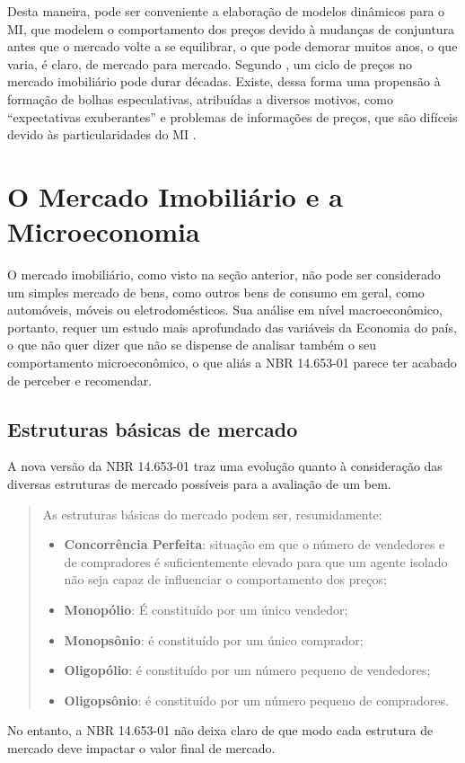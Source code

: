 \documentclass[
	12pt,				%
	oneside,			%
	a4paper,			%
	chapter=TITLE,		%
	section=TITLE,		%
	english,			%
	brazil				%
	]{abntex2}
\begin{document}
Desta maneira, pode ser conveniente a elaboração de modelos dinâmicos para o
\gls{MI}, que modelem o comportamento dos preços devido à mudanças de conjuntura
antes que o mercado volte a se equilibrar, o que pode demorar muitos anos, o que
varia, é claro, de mercado para mercado. Segundo \textcite[p.~4]{regulation}, um ciclo de
preços no mercado imobiliário pode durar décadas. Existe, dessa forma uma
propensão à formação de bolhas especulativas, atribuídas a diversos motivos,
como ``expectativas exuberantes'' e problemas de informações de preços, que são
difíceis devido às particularidades do \gls{MI} \autocite[3]{ADAMS2010}.

\hypertarget{micro}{%
\section{O Mercado Imobiliário e a Microeconomia}\label{micro}}

O mercado imobiliário, como visto na seção anterior, não pode ser
considerado um simples mercado de bens, como outros bens de consumo em geral,
como automóveis, móveis ou eletrodomésticos. Sua análise em nível macroeconômico,
portanto, requer um estudo mais aprofundado das variáveis da Economia do país,
o que não quer dizer que não se dispense de analisar também o seu comportamento
microeconômico, o que aliás a NBR 14.653-01 \autocite*{NBR1465301} parece ter acabado de
perceber e recomendar.

\hypertarget{estruturas-buxe1sicas-de-mercado}{%
\subsection{Estruturas básicas de mercado}\label{estruturas-buxe1sicas-de-mercado}}

A nova versão da NBR 14.653-01 \autocite*[ix]{NBR1465301} traz uma evolução quanto à
consideração das diversas estruturas de mercado possíveis para a avaliação de um
bem.
\begin{quote}
As estruturas básicas do mercado podem ser, resumidamente:
\begin{itemize}
\item
  \textbf{Concorrência Perfeita}: situação em que o número de vendedores e de
  compradores é suficientemente elevado para que um agente isolado não seja
  capaz de influenciar o comportamento dos preços;
\item
  \textbf{Monopólio}: É constituído por um único vendedor;
\item
  \textbf{Monopsônio}: é constituído por um único comprador;
\item
  \textbf{Oligopólio}: é constituído por um número pequeno de vendedores;
\item
  \textbf{Oligopsônio}: é constituído por um número pequeno de compradores.
\end{itemize}
\end{quote}
No entanto, a NBR 14.653-01 \autocite*{NBR1465301} não deixa claro de que modo cada
estrutura de mercado deve impactar o valor final de mercado.
\end{document}
